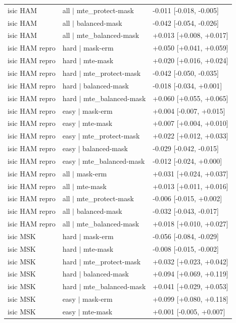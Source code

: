 \begin{table}[H]
\begin{tabular}{lll}
isic HAM & all $|$ mte\_protect-mask & -0.011 [-0.018, -0.005] \\
isic HAM & all $|$ balanced-mask & -0.042 [-0.054, -0.026] \\
isic HAM & all $|$ mte\_balanced-mask & +0.013 [+0.008, +0.017] \\
isic HAM repro & hard $|$ mask-erm & +0.050 [+0.041, +0.059] \\
isic HAM repro & hard $|$ mte-mask & +0.020 [+0.016, +0.024] \\
isic HAM repro & hard $|$ mte\_protect-mask & -0.042 [-0.050, -0.035] \\
isic HAM repro & hard $|$ balanced-mask & -0.018 [-0.034, +0.001] \\
isic HAM repro & hard $|$ mte\_balanced-mask & +0.060 [+0.055, +0.065] \\
isic HAM repro & easy $|$ mask-erm & +0.004 [-0.007, +0.015] \\
isic HAM repro & easy $|$ mte-mask & +0.007 [+0.004, +0.010] \\
isic HAM repro & easy $|$ mte\_protect-mask & +0.022 [+0.012, +0.033] \\
isic HAM repro & easy $|$ balanced-mask & -0.029 [-0.042, -0.015] \\
isic HAM repro & easy $|$ mte\_balanced-mask & -0.012 [-0.024, +0.000] \\
isic HAM repro & all $|$ mask-erm & +0.031 [+0.024, +0.037] \\
isic HAM repro & all $|$ mte-mask & +0.013 [+0.011, +0.016] \\
isic HAM repro & all $|$ mte\_protect-mask & -0.006 [-0.015, +0.002] \\
isic HAM repro & all $|$ balanced-mask & -0.032 [-0.043, -0.017] \\
isic HAM repro & all $|$ mte\_balanced-mask & +0.018 [+0.010, +0.027] \\
isic MSK & hard $|$ mask-erm & -0.056 [-0.084, -0.029] \\
isic MSK & hard $|$ mte-mask & -0.008 [-0.015, -0.002] \\
isic MSK & hard $|$ mte\_protect-mask & +0.032 [+0.023, +0.042] \\
isic MSK & hard $|$ balanced-mask & +0.094 [+0.069, +0.119] \\
isic MSK & hard $|$ mte\_balanced-mask & +0.041 [+0.029, +0.053] \\
isic MSK & easy $|$ mask-erm & +0.099 [+0.080, +0.118] \\
isic MSK & easy $|$ mte-mask & +0.001 [-0.005, +0.007] \\

\end{tabular}
\end{table}
